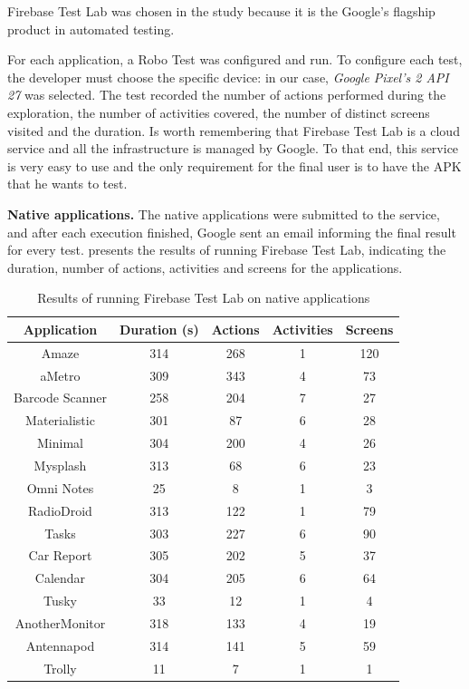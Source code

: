 Firebase Test Lab was chosen in the study because it is the Google's flagship product in automated testing.

For each application, a Robo Test was configured and run. To configure each test, the developer must choose the specific device: in our case, \textit{Google Pixel's 2 API 27} was selected. The test recorded the number of actions performed during the exploration, the number of activities covered, the number of distinct screens visited and the duration. Is worth remembering that Firebase Test Lab is a cloud service and all the infrastructure is managed by Google. To that end, this service is very easy to use and the only requirement for the final user is to have the APK that he wants to test.

\textbf{Native applications.} The native applications were submitted to the service, and after each execution finished, Google sent an email informing the final result for every test.  presents the results of running Firebase Test Lab, indicating the duration, number of actions, activities and screens for the applications.  
\begin{table}[t]
	\centering
	\caption{Results of running Firebase Test Lab on native applications}
	\label{FirebaseNative}
	\begin{adjustbox}{width=0.8\textwidth}
		\begin{tabular}{|c|c|c|c|c|}
			\hline
			\textbf{Application} & \textbf{Duration (s)} & \textbf{Actions} & \textbf{Activities} & \textbf{Screens} \\\hline
			Amaze & 314 & 268 & 1 & 120 \\\hline
			aMetro & 309 & 343 & 4 & 73 \\\hline
			Barcode Scanner & 258 & 204 & 7 & 27 \\\hline
			Materialistic & 301 & 87 & 6 & 28 \\\hline
			Minimal & 304 & 200 & 4 & 26 \\\hline
			Mysplash & 313 & 68 & 6 & 23 \\\hline
			Omni Notes & 25 & 8 & 1 & 3 \\\hline
			RadioDroid & 313 & 122 & 1 & 79 \\\hline
			Tasks & 303 & 227 & 6 & 90 \\\hline
			Car Report & 305 & 202 & 5 & 37 \\\hline
			Calendar & 304 & 205 & 6 & 64 \\\hline
			Tusky & 33 & 12 & 1 & 4 \\\hline
			AnotherMonitor & 318 & 133 & 4 & 19 \\\hline
			Antennapod & 314 & 141 & 5 & 59 \\\hline
			Trolly & 11 & 7 & 1 & 1 \\\hline
		\end{tabular}
	\end{adjustbox}
\end{table}
